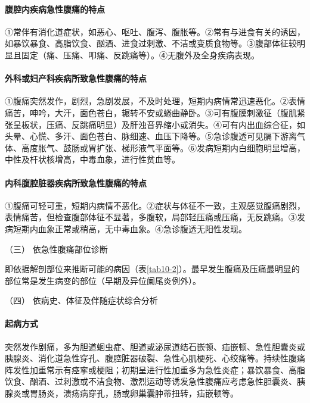 \paragraph{腹腔内疾病急性腹痛的特点}

①常伴有消化道症状，如恶心、呕吐、腹泻、腹胀等。②常有与进食有关的诱因，如暴饮暴食、高脂饮食、酗酒、进食过刺激、不洁或变质食物等。③腹部体征较明显且固定（痛、压痛、叩痛、反跳痛等）。④无腹外及全身疾病表现。

\paragraph{外科或妇产科疾病所致急性腹痛的特点}

①腹痛突然发作，剧烈，急剧发展，不及时处理，短期内病情常迅速恶化。②表情痛苦，呻吟，大汗，面色苍白，辗转不安或蜷曲静卧。③可有腹膜刺激征（腹肌紧张呈板状，压痛、反跳痛明显）及肝浊音界缩小或消失。④可有内出血综合征，如头晕、心慌、多汗、面色苍白、脉细速、血压下降等。⑤急诊腹透可见膈下游离气体、高度胀气、鼓肠或胃扩张、梯形液气平面等。⑥发病短期内白细胞明显增高，中性及杆状核增高，中毒血象，进行性贫血等。

\paragraph{内科腹腔脏器疾病所致急性腹痛的特点}

①腹痛可轻可重，短期内病情不恶化。②症状与体征不一致，主观感觉腹痛剧烈，表情痛苦，但检查腹部体征不显著，多腹软，局部轻压痛或压痛，无反跳痛。③发病短期内血象正常或稍高，无中毒血象。④急诊腹透无阳性发现。

\hypertarget{text00026.htmlux5cux23CHP1-10-2-1-3}{}
（三） 依急性腹痛部位诊断

即依据解剖部位来推断可能的病因（表\ref{tab10-2}）。最早发生腹痛及压痛最明显的部位常是发生病变的部位（早期及异位阑尾炎例外）。

\hypertarget{text00026.htmlux5cux23CHP1-10-2-1-4}{}
（四） 依病史、体征及伴随症状综合分析

\paragraph{起病方式}

突然发作剧痛，多为胆道蛔虫症、胆道或泌尿道结石嵌顿、疝嵌顿、急性胆囊炎或胰腺炎、消化道急性穿孔、腹腔脏器破裂、急性心肌梗死、心绞痛等。持续性腹痛阵发性加重常示有痉挛或梗阻；初期呈进行性加重多为急性炎症；暴饮暴食、高脂饮食、酗酒、过刺激或不洁食物、激烈运动等诱发急性腹痛应考虑急性胆囊炎、胰腺炎或胃肠炎，溃疡病穿孔，肠或卵巢囊肿蒂扭转，疝嵌顿等。

